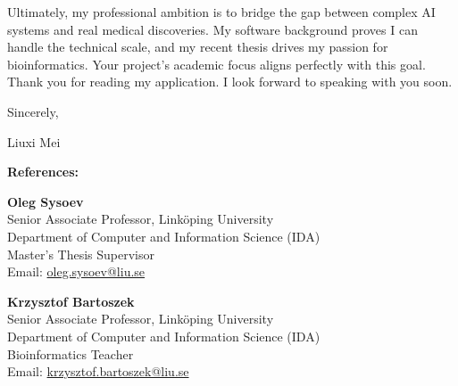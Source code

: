 \documentclass[11pt,a4paper]{article}
\begin{document}
Ultimately, my professional ambition is to bridge the gap between complex AI systems and real medical discoveries. My software background proves I can handle the technical scale, and my recent thesis drives my passion for bioinformatics. Your project's academic focus aligns perfectly with this goal. Thank you for reading my application. I look forward to speaking with you soon.

Sincerely,

Liuxi Mei

\vspace{0.5cm}
\noindent
\begin{minipage}{\textwidth}
\textbf{References:}

\vspace{0.3cm}
\begin{minipage}[t]{0.48\textwidth}
\textbf{Oleg Sysoev}\\
Senior Associate Professor, Linköping University\\
Department of Computer and Information Science (IDA)\\
Master's Thesis Supervisor\\
Email: \href{mailto:oleg.sysoev@liu.se}{oleg.sysoev@liu.se}
\end{minipage}%
\hfill
\begin{minipage}[t]{0.48\textwidth}
\textbf{Krzysztof Bartoszek}\\
Senior Associate Professor, Linköping University\\
Department of Computer and Information Science (IDA)\\
Bioinformatics Teacher\\
Email: \href{mailto:krzysztof.bartoszek@liu.se}{krzysztof.bartoszek@liu.se}
\end{minipage}
\end{minipage}

\renewcommand{\refname}{Selected references}


\end{document}
